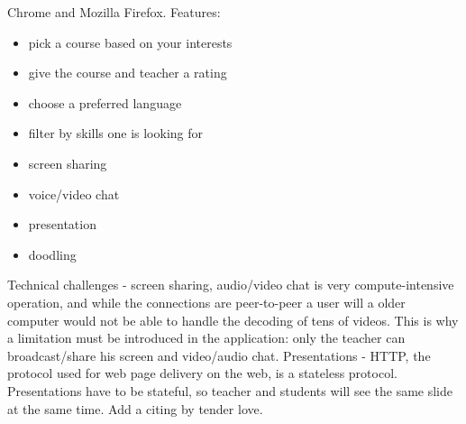 Chrome and Mozilla Firefox.
Features:
\begin{itemize}
    \item pick a course based on your interests
    \item give the course and teacher a rating
    \item choose a preferred language
    \item filter by skills one is looking for
    \item screen sharing
    \item voice/video chat
    \item presentation
    \item doodling
\end{itemize}
Technical challenges - screen sharing, audio/video chat is very
compute-intensive operation, and while the connections are peer-to-peer
a user will a older computer would not be able to handle the decoding of tens of
videos. This is why a limitation must be introduced in the
application: only the teacher can broadcast/share his screen and video/audio
chat. Presentations - HTTP, the protocol used for web page delivery
on the web, is a stateless protocol. Presentations have to be stateful, so
teacher and students will see the same slide at the same time.
Add a citing by \citet{tenderlove} tender love.

